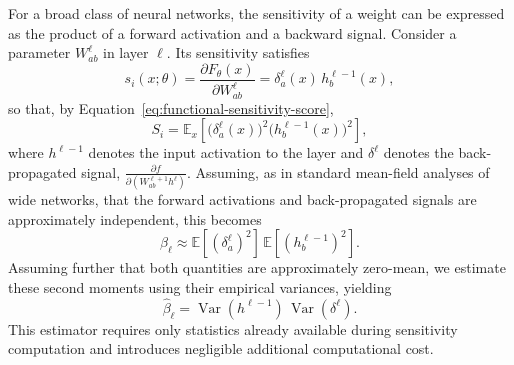 \documentclass{article}
\theoremstyle{definition}
\theoremstyle{remark}
\begin{document}
For a broad class of neural networks, the sensitivity of a weight can be expressed as the product of a forward activation and a backward signal. Consider a parameter $W_{ab}^{\ell}$ in layer $\ell$. Its sensitivity satisfies
\begin{equation}
\label{eq:sensitivity_decomposition}
s_i(x;\theta)
=
\frac{\partial F_\theta(x)}{\partial W_{ab}^{\ell}}
=
\delta_a^{\ell}(x)\,
h_b^{\ell-1}(x),
\end{equation}
so that, by Equation~\eqref{eq:functional-sensitivity-score},
\begin{equation}
S_i
=
\mathbb{E}_x\!\left[
\bigl(\delta_a^{\ell}(x)\bigr)^2
\bigl(h_b^{\ell-1}(x)\bigr)^2
\right],
\end{equation}
where $h^{\ell-1}$ denotes the input activation to the layer and $\delta^{\ell}$ denotes the back-propagated signal, $\frac{\partial f}{\partial (W_{ab}^{\ell + 1}h^\ell)}$. Assuming, as in standard mean-field analyses of wide networks, that the forward activations and back-propagated signals are approximately independent, this becomes
\begin{equation}
\beta_{\ell}
\approx
\mathbb{E}
\!\left[
(\delta_a^{\ell})^2
\right]
\,
\mathbb{E}
\!\left[
(h_b^{\ell-1})^2
\right].
\end{equation}
Assuming further that both quantities are approximately zero-mean, we estimate these second moments using their empirical variances, yielding
\begin{equation}
\widehat{\beta}_{\ell}
=
\operatorname{Var}(h^{\ell-1})
\,
\operatorname{Var}(\delta^{\ell}).
\end{equation}
This estimator requires only statistics already available during sensitivity computation and introduces negligible additional computational cost.
\end{document}
